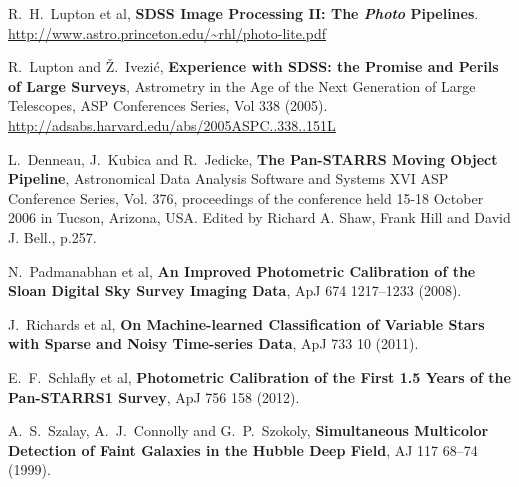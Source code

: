 \documentclass[12pt]{article}
\begin{document}
\begin{thebibliography}{10}
 R.~H.~Lupton et al,
  \textbf{SDSS Image Processing II: The \textit{Photo} Pipelines}.
  \url{http://www.astro.princeton.edu/~rhl/photo-lite.pdf}

 R.~Lupton and \v{Z}.~Ivezi\'c, \textbf{Experience with SDSS: the Promise and Perils of Large Surveys},
  Astrometry in the Age of the Next Generation of Large Telescopes, ASP
  Conferences Series, Vol 338 (2005). \url{http://adsabs.harvard.edu/abs/2005ASPC..338..151L}

 L.~Denneau, J.~Kubica and R.~Jedicke,
   \textbf{The Pan-STARRS Moving Object Pipeline}, Astronomical Data
  Analysis Software and Systems XVI ASP Conference Series, Vol. 376,
  proceedings of the conference held 15-18 October 2006 in Tucson,
  Arizona, USA\@. Edited by Richard A. Shaw, Frank Hill and David
  J. Bell., p.257.

 N.~Padmanabhan et al,
  \textbf{An Improved Photometric Calibration of the Sloan Digital Sky Survey Imaging Data},
  ApJ 674 1217--1233 (2008).

 J.~Richards et al,
  \textbf{On Machine-learned Classification of Variable Stars with Sparse and Noisy Time-series Data},
  ApJ 733 10 (2011).

 E.~F.~Schlafly et al,
  \textbf{Photometric Calibration of the First 1.5 Years of the Pan-STARRS1 Survey},
  ApJ 756 158 (2012).

 A.~S.~Szalay, A.~J.~Connolly and G.~P.~Szokoly,
  \textbf{Simultaneous Multicolor Detection of Faint Galaxies in the Hubble Deep Field},
  AJ 117 68--74 (1999).

\end{thebibliography}
\end{document}
